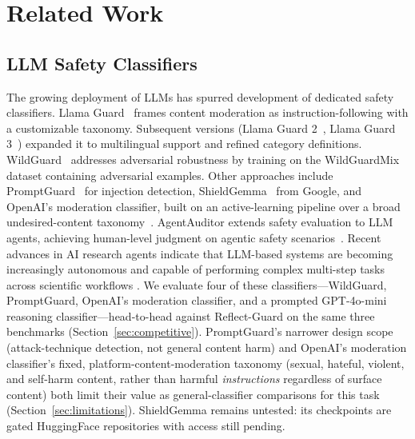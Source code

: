 \documentclass[superintelligence,article,accept,moreauthors]{Definitions/mdpi}
\renewcommand{\highlighting}[1]{#1}
\begin{document}
\section{Related Work}

\subsection{\highlighting{LLM Safety Classifiers} %
}
The growing deployment of LLMs has spurred development of dedicated safety classifiers. Llama Guard~\citep{inan2023llamaguard} frames content moderation as instruction-following with a customizable taxonomy. Subsequent versions (Llama Guard 2~\citep{metallamaguard2}, Llama Guard 3~\citep{metallamaguard3}) expanded it to multilingual support and refined category definitions. WildGuard~\citep{han2024wildguard} addresses adversarial robustness by training on the WildGuardMix dataset containing adversarial examples. Other approaches include PromptGuard~\citep{meta2024promptguard} for injection detection, ShieldGemma~\citep{zeng2024shieldgemma} from Google, and OpenAI's moderation classifier, built on an active-learning pipeline over a broad undesired-content taxonomy~\citep{markov2023holistic}. AgentAuditor extends safety evaluation to LLM agents, achieving human-level judgment on agentic safety \mbox{scenarios~\citep{luo2025agentauditor}.} Recent advances in AI research agents indicate that LLM-based systems are becoming increasingly autonomous and capable of performing complex multi-step tasks across scientific workflows \citep{kong2026aiautoresearch}. We evaluate four of these classifiers---WildGuard, PromptGuard, OpenAI's moderation classifier, and a prompted GPT-4o-mini reasoning classifier---head-to-head against Reflect-Guard on the same three benchmarks (Section~\ref{sec:competitive}). PromptGuard's narrower design scope (attack-technique detection, not general content harm) and OpenAI's moderation classifier's fixed, platform-content-moderation taxonomy (sexual, hateful, violent, and self-harm content, rather than harmful \emph{instructions} regardless of surface content) both limit their value as general-classifier comparisons for this task (Section~\ref{sec:limitations}). ShieldGemma remains untested: its checkpoints are gated HuggingFace repositories with access still pending.
\end{document}
